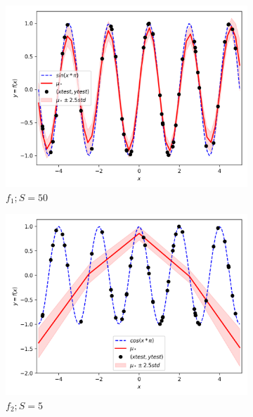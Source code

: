 \documentclass{article}
\begin{document}
\begin{figure}
\begin{subfigure}{.33\textwidth}
    \includegraphics[width=\linewidth]{test_size/func1_50.png}
    \caption{$f_1; S = 50$}
  \end{subfigure}
  \begin{subfigure}{.33\textwidth}
    \centering
    \includegraphics[width=\linewidth]{test_size/func2_5.png}
    \caption{$f_2; S = 5$}
  \end{subfigure}
  \begin{subfigure}{.33\textwidth}
    \centering

\end{subfigure}
\end{figure}
\end{document}
